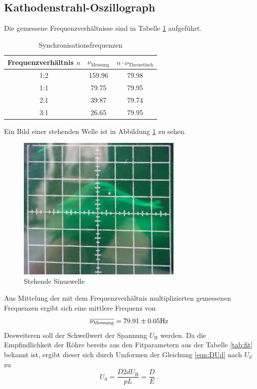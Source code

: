 \subsection{Kathodenstrahl-Oszillograph}
Die gemessene Frequenzverhältnisse sind in Tabelle \ref{tab:sync} aufgeführt.
\begin{table}[H]
  \centering
  \begin{tabular}{c c c}
    \toprule
    Frequenzverhältnis $n$ & $\nu_\text{Messung}$ & $n \cdot \nu_\text{Theoretisch}$ \\
    \midrule
    1:2	& 159.96& 79.98 \\
    1:1	& 79.75 & 79.95	\\
    2:1	& 39.87 & 79.74	\\
    3:1	& 26.65 & 79.95	\\
    \bottomrule
  \end{tabular}
  \caption{Synchronisationsfrequenzen}
  \label{tab:sync}
\end{table}
Ein Bild einer stehenden Welle ist in Abbildung \ref{fig:pic} zu sehen.
\begin{figure}[H]
  \centering
  \includegraphics[height=7cm]{picture/sinus.png}
  \caption{Stehende Sinuswelle}
  \label{fig:pic}
\end{figure}
Aus Mittelung der mit dem Frequenzverhältnis multiplizierten gemessenen Frequenzen ergibt sich eine mittlere Frequenz von
\begin{equation}
  \overline{\nu_\text{Messung}} = \num{79.91 +- 0.05} \text{Hz}
  \label{eqn:numess}
\end{equation}
Desweiteren soll der Schwellwert der Spannung $U_\text{B}$ werden. Da die Empfindlichkeit der Röhre bereits aus den Fitparametern aus der Tabelle \ref{tab:fit} bekannt ist, ergibt dieser sich durch Umformen der Gleichung \eqref{eqn:DUd} nach $U_d$ zu
\begin{equation}
  U_\text{d} = \frac{D 2 d U_\text{B}}{p L} = \frac{D}{E} \ .
  \label{eqn:dfs}
\end{equation}
